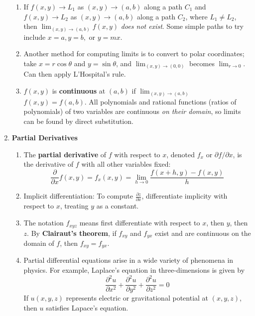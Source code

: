 \documentclass[10pt]{article}
\begin{document}
\begin{multicols*}{2}
\begin{enumerate}
\begin{enumerate}
        \item If $f(x,y) \rightarrow L_1$ as $(x,y) \rightarrow (a,b)$ along a path $C_1$ and $f(x,y) \rightarrow L_2$ as $(x,y) \rightarrow (a,b)$ along a path $C_2$, where $L_1 \neq L_2$, then $\lim_{(x,y) \rightarrow (a,b)} f(x,y)$ \textit{does not exist}. Some simple paths to try include $x=a,y=b,$ or $y=mx$.
        
        \item Another method for computing limits is to convert to polar coordinates; take $x=r\cos{\theta}$ and $y=\sin{\theta}$, and $\lim_{(x,y) \rightarrow (0,0)}$ becomes $\lim_{r \rightarrow 0}$. Can then apply L’Hospital’s rule.
        
        \item $f(x,y)$ is \textbf{continuous} at $(a,b)$ if $\lim_{(x,y) \rightarrow (a,b)}$ $f(x,y) = f(a,b)$. All polynomials and rational functions (ratios of polynomials) of two variables are continuous \textit{on their domain}, so limits can be found by direct substitution.
    \end{enumerate}
    
    \item \textbf{Partial Derivatives}
    \begin{enumerate}
        \item The \textbf{partial derivative} of $f$ with respect to $x$, denoted $f_x$ or $\partial f / \partial x$, is the derivative of $f$ with all other variables fixed: 
        $$
        \frac{\partial}{\partial x} f(x,y) = f_x(x,y) = \lim_{h\rightarrow 0} \frac{f(x+h,y) - f(x,y)}{h}$$
        \item Implicit differentiation: To compute $\frac{\partial z}{\partial x}$, differentiate implicity with respect to $x$, treating $y$ as a constant.
        \item The notation $f_{xyz}$ means first differentiate with respect to $x$, then $y$, then $z$. By \textbf{Clairaut’s theorem}, if $f_{xy}$ and $f_{yx}$ exist and are continuous on the domain of $f$, then $f_{xy} = f_{yx}$. 
        \item Partial differential equations arise in a wide variety of phenomena in physics. For example, Laplace's equation in three-dimensions is given by
        $$ \frac{\partial^2 u}{\partial x^2} + \frac{\partial^2 u}{\partial y^2} + \frac{\partial^2 u}{\partial z^2} = 0$$
        If $u(x,y,z)$ represents electric or gravitational potential at $(x,y,z)$, then $u$ satisfies Lapace's equation.
    \end{enumerate}
    

\end{enumerate}
\end{multicols*}
\end{document}
